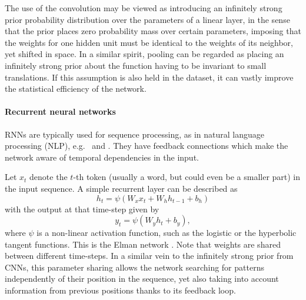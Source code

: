  The use of the convolution may be viewed as introducing an inﬁnitely strong prior probability distribution over the parameters of a linear layer, in the sense that the prior places zero probability mass over certain parameters, imposing that the weights for one hidden unit must be identical to the weights of its neighbor, yet shifted in space. In a 
  similar spirit, pooling can be regarded as placing an inﬁnitely strong prior about the function having to be invariant to small translations. If this assumption is also held in the dataset, it can vastly improve the statistical eﬃciency of the network.
 



\paragraph{Recurrent neural networks} RNNs are typically used for sequence processing, as in natural language processing (NLP), e.g.\ \parencite{hochreiter1997long} and \parencite{chung2014empirical}. They have feedback connections which make the network aware of temporal dependencies in the input.

Let $x_t$ denote the $t$-th token (usually a word, but could even be 
a smaller part) in the input sequence. A simple recurrent layer can be described as
$$
h_t = \psi(W_x x_t + W_h h_{t-1} + b_h)
$$
with the output at that time-step given by
$$
y_t = \psi(W_y h_t + b_y),
$$
where $\psi$ is a non-linear activation function, such as the logistic or the hyperbolic tangent functions. This is the Elman network \parencite{cruse2006neural}. Note that weights are shared between different time-steps. In a similar vein to the infinitely strong prior from CNNs, this parameter sharing allows the network searching for patterns independently of their position in the sequence, yet also taking into account information from previous positions thanks to its feedback loop.

